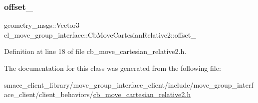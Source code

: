 \subsubsection{\texorpdfstring{offset\+\_\+}{offset\_}}
{\footnotesize\ttfamily geometry\+\_\+msgs\+::\+Vector3 cl\+\_\+move\+\_\+group\+\_\+interface\+::\+Cb\+Move\+Cartesian\+Relative2\+::offset\+\_\+}



Definition at line 18 of file cb\+\_\+move\+\_\+cartesian\+\_\+relative2.\+h.



The documentation for this class was generated from the following file\+:\begin{DoxyCompactItemize}
\item 
smacc\+\_\+client\+\_\+library/move\+\_\+group\+\_\+interface\+\_\+client/include/move\+\_\+group\+\_\+interface\+\_\+client/client\+\_\+behaviors/\hyperlink{cb__move__cartesian__relative2_8h}{cb\+\_\+move\+\_\+cartesian\+\_\+relative2.\+h}\end{DoxyCompactItemize}
